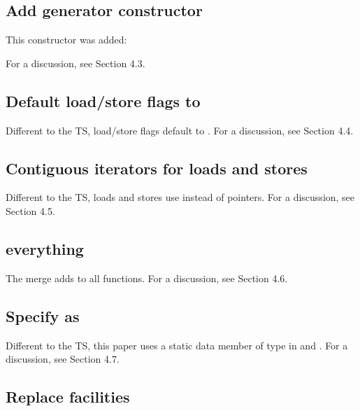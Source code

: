 \subsection{Add  generator constructor}

This constructor was added:

For a discussion, see  Section 4.3.

\subsection{Default load/store flags to }

Different to the TS, load/store flags default to .
For a discussion, see  Section 4.4.

\subsection{Contiguous iterators for loads and stores}\label{sec:contiguousItLoadStore}

Different to the TS, loads and stores use  instead of pointers.
For a discussion, see  Section 4.5.

\subsection{ everything}
The merge adds  to all functions.
For a discussion, see  Section 4.6.

\subsection{Specify  as }

Different to the TS, this paper uses a static data member  of type
\std{} in \simd and \mask.
For a discussion, see  Section 4.7.

\subsection{Replace  facilities}

